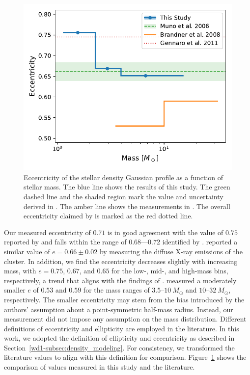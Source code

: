 \documentclass[12pt]{ucsddissertation}
\begin{document}
\begin{CJK*}{UTF8}{gbsn}
\begin{figure}[htb!]
    \centering
    \includegraphics[width=0.7\linewidth]{figures/chapter2/eccentricity.pdf}
    \caption[Eccentricity of the stellar density Gaussian profile]{Eccentricity of the stellar density Gaussian profile as a function of stellar mass. 
    The blue line shows the results of this study. The green dashed line and the shaded region mark the value and uncertainty derived in \citet{Muno-2006}. The amber line shows the measurements in \citet{Brandner-2008}. The overall eccentricity claimed by \citet{Gennaro-2011} is marked as the red dotted line.}
    \label{fig:eccentricity}
\end{figure}

Our measured eccentricity of $0.71$ is in good agreement with the value of $0.75$ reported by \citet{Gennaro-2011} and falls within the range of $0.68$––$0.72$ identified by \citet{Andersen-2017}. \citet{Muno-2006} reported a similar value of $e=0.66 \pm 0.02$ by measuring the diffuse X-ray emissions of the cluster. In addition, we find the eccentricity decreases slightly with increasing mass, with $e=0.75$, $0.67$, and $0.65$ for the low-, mid-, and high-mass bins, respectively, a trend that aligns with the findings of \citet{Gennaro-2011}. \citet{Brandner-2008} measured a moderately smaller $e$ of $0.53$ and $0.59$ for the mass ranges of $3.5$--$10~M_\odot$ and $10$--$32~M_\odot$, respectively. The smaller eccentricity may stem from the bias introduced by the authors' assumption about a point-symmetric half-mass radius. Instead, our measurement did not impose any assumption on the mass distribution. Different definitions of eccentricity and ellipticity are employed in the literature. In this work, we adopted the definition of ellipticity and eccentricity as described in Section~\ref{wd1-subsec:density_modeling}. For consistency, we transformed the literature values to align with this definition for comparison. Figure~\ref{fig:eccentricity} shows the comparison of values measured in this study and the literature. 


\end{CJK*}
\end{document}
